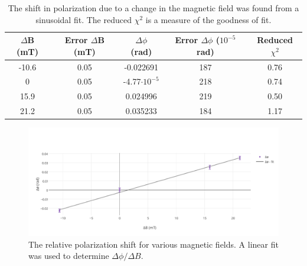 \documentclass[prb,preprint]{revtex4-1}
\begin{document}
{{\begin{table}
    \begin{ruledtabular}
        \begin{tabular}{ccccc}
            $\Delta$B (mT)&Error $\Delta$B (mT)&$\Delta \phi$ (rad)&Error $\Delta\phi$ ($10^{-5}$ rad)&Reduced $\chi^2$ \\  \hline
            -10.6 & 0.05 & -0.022691 & 187 & 0.76 \\
            0     & 0.05 & -4.77$\cdot10^{-5}$ & 218 & 0.74 \\
            15.9  & 0.05 & 0.024996  & 219 & 0.50 \\
            21.2  & 0.05 & 0.035233  & 184 & 1.17
        \end{tabular}
    \end{ruledtabular}
\caption{\label{shift table}The shift in polarization due to a change in the magnetic field was found from a sinusoidal fit. The reduced $\chi^2$ is a measure of the goodness of fit.}
\end{table}
\begin{figure}
\includegraphics[width =6.3in]{verdet1.pdf}
\caption{\label{method1pic} The relative polarization shift for various magnetic fields. A linear fit was used to determine $\Delta \phi/\Delta B$.}
\end{figure}
}

\newpage
}
\end{document}
